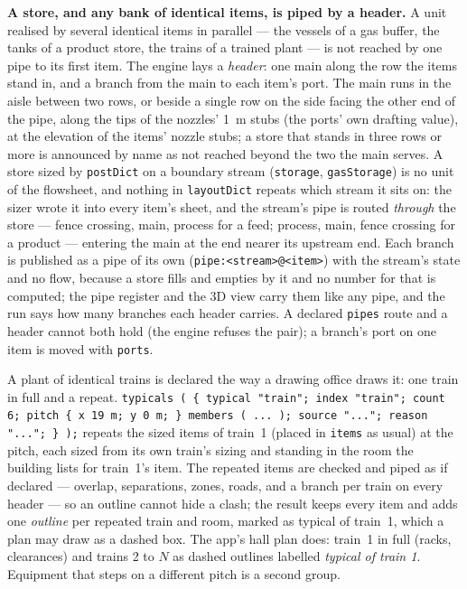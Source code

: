 \documentclass[11pt,a4paper]{article}
\begin{document}
\textbf{A store, and any bank of identical items, is piped by a header.}
A unit realised by several identical items in parallel --- the vessels
of a gas buffer, the tanks of a product store, the trains of a trained
plant --- is not reached by one pipe to its first item. The engine lays a
\emph{header}: one main along the row the items stand in, and a branch
from the main to each item's port. The main runs in the aisle between two
rows, or beside a single row on the side facing the other end of the
pipe, along the tips of the nozzles' 1~m stubs (the ports' own drafting
value), at the elevation of the
items' nozzle stubs; a store that stands in three rows or more is
announced by name as not reached beyond the two the main serves. A store
sized by \texttt{postDict} on a boundary stream (\texttt{storage},
\texttt{gasStorage}) is no unit of the flowsheet, and nothing in
\texttt{layoutDict} repeats which stream it sits on: the sizer wrote it
into every item's sheet, and the stream's pipe is routed \emph{through}
the store --- fence crossing, main, process for a feed; process, main,
fence crossing for a product --- entering the main at the end nearer its
upstream end. Each branch is published as a pipe of its own
(\texttt{pipe:<stream>@<item>}) with the stream's state and no flow,
because a store fills and empties by it and no number for that is
computed; the pipe register and the 3D view carry them like any pipe,
and the run says how many branches each header carries. A declared
\texttt{pipes} route and a header cannot both hold (the engine refuses
the pair); a branch's port on one item is moved with \texttt{ports}.

A plant of identical trains is declared the way a drawing office draws
it: one train in full and a repeat. \texttt{typicals ( \{ typical
"train"; index "train"; count 6; pitch \{ x 19 m; y 0 m; \} members (
... ); source "..."; reason "..."; \} );} repeats the sized items of
train~1 (placed in \texttt{items} as usual) at the pitch, each sized from
its own train's sizing and standing in the room the building lists for
train~1's item. The repeated items are checked and piped as if declared
--- overlap, separations, zones, roads, and a branch per train on every
header --- so an outline cannot hide a clash; the result keeps every item
and adds one \emph{outline} per repeated train and room, marked as typical
of train~1, which a plan may draw as a dashed box. The app's hall plan
does: train~1 in full (racks, clearances) and trains 2 to $N$ as dashed
outlines labelled \emph{typical of train 1}.
Equipment that steps on a different pitch is a second group.
\end{document}

